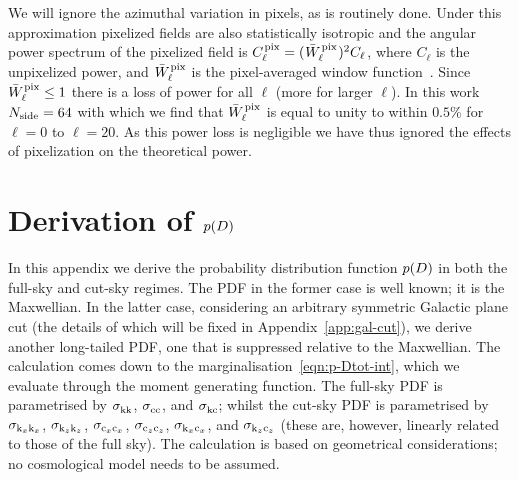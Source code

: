 We will ignore the azimuthal variation in pixels,
as is routinely done. Under this
approximation pixelized fields are also statistically isotropic and the angular power spectrum
of the pixelized field is
$
    C^{\mathrm{\hspace{0.09em} pix}}_\ell = (\hspace{0.06em}\bar{W}^{\mathrm{\hspace{0.09em} pix}}_\ell\hspace{0.06em})^2 C_\ell
$,
where $C_\ell$ is the unpixelized power, and $\bar{W}^{\mathrm{\hspace{0.06em} pix}}_\ell$ is the \healpix
pixel-averaged window function~\citep{2005ApJ...622..759G}. Since $\bar{W}^{\mathrm{\hspace{0.06em} pix}}_\ell\leq1$ there is a loss of power for all
$\ell$ (more for larger $\ell$).
In this work $N_{\mathrm{side}}=64$ with which we find that
$\bar{W}^{\mathrm{\hspace{0.09em} pix}}_\ell$ is equal to unity to
within $0.5\%$ for $\ell=0$ to $\ell=20$. As this power loss is negligible we have thus
ignored the effects of pixelization on the theoretical power.





\section{Derivation of $p(D)$}\label{app:pD_derivation}
In this appendix we derive the probability distribution function $p(D)$ in both the full-sky and cut-sky regimes. The PDF in the former case is well known; it is the Maxwellian. In the latter case, considering an arbitrary symmetric Galactic
plane cut (the details of which will be fixed in Appendix~\ref{app:gal-cut}),
we derive another long-tailed PDF, one that is suppressed relative to the Maxwellian.
The calculation comes down to the marginalisation~\eqref{eqn:p-Dtot-int}, which we evaluate through the moment generating function. The full-sky PDF is parametrised by $\sigkin$,
$\sigint$, and $\sigkinint$; whilst the cut-sky PDF is parametrised by
$\sigma_{{\rm k}_x{\rm k}_x}$, $\sigma_{{\rm k}_z{\rm k}_z}$,
$\sigma_{{\rm c}_x{\rm c}_x}$, $\sigma_{{\rm c}_z{\rm c}_z}$, $\sigma_{{\rm k}_x{\rm c}_x}$, and
$\sigma_{{\rm k}_z{\rm c}_z}$ (these are, however, linearly related to those of the full sky).
The calculation is based on geometrical considerations;
no cosmological model needs to be assumed.

